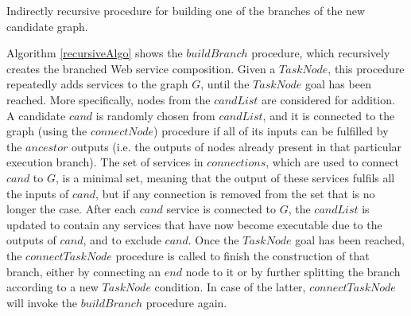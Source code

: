 \begin{algorithm}
 \setlength{}
  
 \LinesNumbered
 \SetNlSty{}{}{:}

 \caption{\footnotesize Indirectly recursive procedure for building one of the branches of the new candidate graph.}
\label{recursiveAlgo}
\end{algorithm}

Algorithm \ref{recursiveAlgo} shows the $buildBranch$ procedure, which recursively creates the branched Web service composition. Given a $TaskNode$, this procedure repeatedly adds 
services to the graph $G$, until the $TaskNode$ goal has been reached. More specifically, nodes from the $candList$ are considered for addition. A candidate $cand$ is randomly chosen from $candList$, and it is connected to the graph (using the $connectNode$) procedure if all of its inputs can be fulfilled by the $ancestor$ outputs (i.e. the outputs of nodes already present in that particular execution branch). The set of services in $connections$, which are used to connect $cand$ to $G$, is a minimal set, meaning that the output of these services fulfils all the inputs of $cand$, but if any connection is removed from the set that is no longer the case. After each $cand$ service is connected to $G$, the $candList$ is updated to contain any services that have now become executable due to the outputs of $cand$, and to exclude $cand$. Once the $TaskNode$ goal has been reached, the $connectTaskNode$ procedure is called to finish the construction of that branch, either by connecting an $end$ node to it or by further splitting the branch according to a new $TaskNode$ condition. In case of the latter, $connectTaskNode$ will invoke the $buildBranch$ procedure again.

